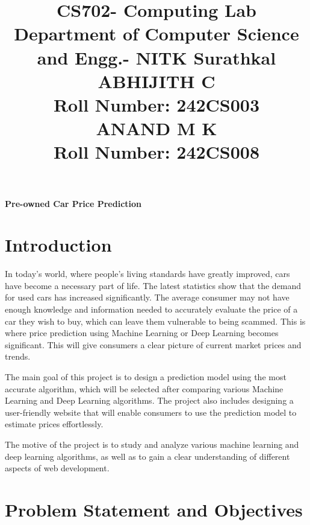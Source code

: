 \documentclass[a4paper,12pt]{article}
\title{
  \vspace{-2em} %
  \textbf{CS702- Computing Lab} \\ %
  \large \textbf{ Department of Computer Science and Engg.- NITK Surathkal} \\ %
  \vspace{1em} %
  \textbf{ABHIJITH C} \\ %
  Roll Number: 242CS003 \\%
  \textbf{ANAND M K} \\ %
  Roll Number: 242CS008 \\%
}
\date{} %
\begin{document}
\maketitle

\begin{titlepage}
\begin{center}

    \vspace*{0.1in}

    {\Huge\bfseries Pre-owned Car Price Prediction\par}
    \vspace{1in}
\end{center}

\section*{Introduction}
\begin{justify}

In today's world, where people’s living standards have greatly improved, cars have become a necessary part of life. The latest statistics show that the demand for used cars has increased significantly.  The average consumer may not have enough knowledge and information needed to accurately evaluate the price of a car they wish to buy, which can leave them vulnerable to being scammed. This is where price prediction using Machine Learning or Deep Learning becomes significant. This will give consumers a clear picture of current market prices and trends.  
\newline

The main goal of this project is to design a prediction model using the most accurate algorithm, which will be selected after comparing various Machine Learning and Deep Learning algorithms. The project also includes designing a user-friendly website that will enable consumers to use the prediction model to estimate prices effortlessly.
\newline

The motive of the project is to study and analyze various machine learning and deep learning algorithms, as well as to gain a clear understanding of different aspects of web development.

\end{justify}

\section*{Problem Statement and Objectives}
\begin{justify}


\end{justify}
\end{titlepage}
\end{document}
